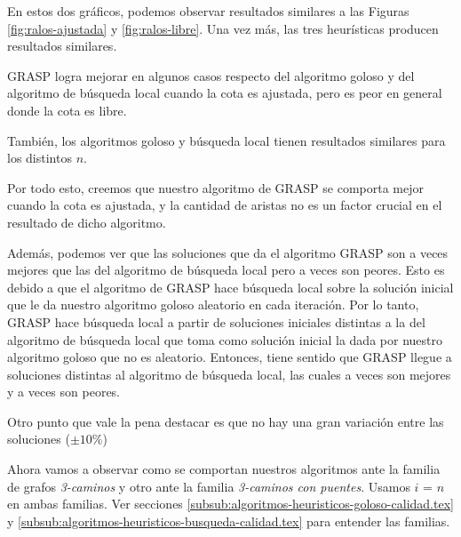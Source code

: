 En estos dos gráficos, podemos observar resultados similares a las Figuras \ref{fig:ralos-ajustada} y \ref{fig:ralos-libre}. Una vez más, las tres heurísticas producen resultados similares. 

GRASP logra mejorar en algunos casos respecto del algoritmo goloso y del algoritmo de búsqueda local cuando la cota es ajustada, pero es peor en general donde la cota es libre.

También, los algoritmos goloso y búsqueda local tienen resultados similares para los distintos $n$.

Por todo esto, creemos que nuestro algoritmo de GRASP se comporta mejor cuando la cota es ajustada, y la cantidad de aristas no es un factor crucial en el resultado de dicho algoritmo.

Además, podemos ver que las soluciones que da el algoritmo GRASP son a veces mejores que las del algoritmo de búsqueda local pero a veces son peores. Esto es debido a que el algoritmo de GRASP hace búsqueda local sobre la solución inicial que le da nuestro algoritmo goloso aleatorio en cada iteración. Por lo tanto, GRASP hace búsqueda local a partir de soluciones iniciales distintas a la del algoritmo de búsqueda local que toma como solución inicial la dada por nuestro algoritmo goloso que no es aleatorio. Entonces, tiene sentido que GRASP llegue a soluciones distintas al algoritmo de búsqueda local, las cuales a veces son mejores y a veces son peores.

Otro punto que vale la pena destacar es que no hay una gran variación entre las soluciones ($ \pm 10\%$)



% 


Ahora vamos a observar como se comportan nuestros algoritmos ante la familia de grafos \emph{3-caminos} y otro ante la familia \emph{3-caminos con puentes}. Usamos $i$ = $n$ en ambas familias. Ver secciones \ref{subsub:algoritmos-heuristicos-goloso-calidad.tex} y \ref{subsub:algoritmos-heuristicos-busqueda-calidad.tex} para entender las familias.


